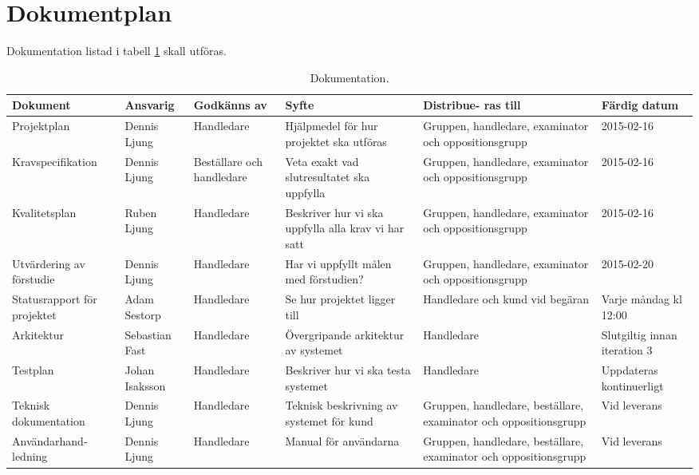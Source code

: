 \section{Dokumentplan}
Dokumentation listad i tabell \ref{dokumentation:tabell} skall utföras.

\begin{table}[H]
	\centering
		\begin{tabularx}{\textwidth}{| p{20mm} | l | X | p{20mm} | X | X |}
			\hline
			\textbf{Dokument} & \textbf{Ansvarig} & \textbf{Godkänns av} & \textbf{Syfte} & \textbf{Distribue-
  ras till} & \textbf{Färdig datum} \\\hline

    		
			{Projektplan} & {Dennis Ljung} & {Handledare} & {Hjälpmedel för hur projektet ska utföras} & {Gruppen, handledare, examinator och oppositionsgrupp} & {2015-02-16} \\\hline
			
			{Kravspecifikation} & {Dennis Ljung} & {Beställare och handledare} & {Veta exakt vad slutresultatet ska uppfylla} & {Gruppen, handledare, examinator och oppositionsgrupp} & {2015-02-16} \\\hline
			
			{Kvalitetsplan} & {Ruben Ljung} & {Handledare} & {Beskriver hur vi ska uppfylla alla krav vi har satt} & {Gruppen, handledare, examinator och oppositionsgrupp} & {2015-02-16} \\\hline
			
						{Utvärdering av förstudie} & {Dennis Ljung} & {Handledare} & {Har vi uppfyllt målen med förstudien?} & {Gruppen, handledare, examinator och oppositionsgrupp} & {2015-02-20} \\\hline
			
			{Statusrapport för projektet} & {Adam Sestorp} & {Handledare} & {Se hur projektet ligger till} & {Handledare och kund vid begäran} & {Varje måndag kl 12:00} \\\hline
			
            {Arkitektur} & {Sebastian Fast} & {Handledare} & {Övergripande arkitektur av systemet} & {Handledare} & {Slutgiltig innan iteration 3} \\\hline
               {Testplan} & {Johan Isaksson} & {Handledare} & {Beskriver hur vi ska testa systemet} & {Handledare} & {Uppdateras kontinuerligt} \\\hline

          {Teknisk dokumentation} & {Dennis Ljung} & {Handledare} & {Teknisk beskrivning av systemet för kund} & {Gruppen, handledare, beställare, examinator och oppositionsgrupp} & {Vid leverans} \\\hline			
			
            {Användarhand-ledning} & {Dennis Ljung} & {Handledare} & {Manual för användarna} & {Gruppen, handledare, beställare, examinator och oppositionsgrupp} & {Vid leverans} \\\hline
            
			
			
		\end{tabularx}
	\caption{Dokumentation.} \label{dokumentation:tabell}
\end{table}
